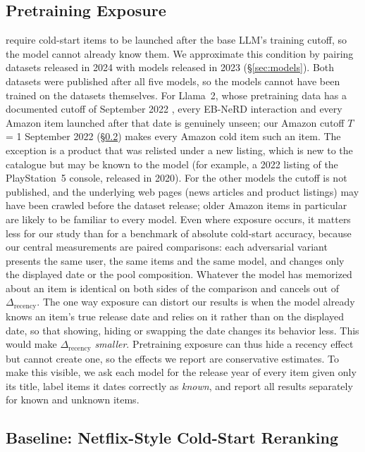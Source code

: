 \documentclass[11pt]{article}
\begin{document}
\subsection{Pretraining Exposure}\label{sec:exposure}
\citet{li2026llmreasoning} require cold-start items to be launched after the base LLM's training cutoff, so the model cannot already know them. We approximate this condition by pairing datasets released in 2024 with models released in 2023 (\S\ref{sec:models}). Both datasets were published after all five models, so the models cannot have been trained on the datasets themselves. For Llama~2, whose pretraining data has a documented cutoff of September 2022 \citep{touvron2023llama2}, every EB-NeRD interaction and every Amazon item launched after that date is genuinely unseen; our Amazon cutoff $T$ = 1 September 2022 (\S\ref{sec:baseline}) makes every Amazon cold item such an item. The exception is a product that was relisted under a new listing, which is new to the catalogue but may be known to the model (for example, a 2022 listing of the PlayStation~5 console, released in 2020). For the other models the cutoff is not published, and the underlying web pages (news articles and product listings) may have been crawled before the dataset release; older Amazon items in particular are likely to be familiar to every model. Even where exposure occurs, it matters less for our study than for a benchmark of absolute cold-start accuracy, because our central measurements are paired comparisons: each adversarial variant presents the same user, the same items and the same model, and changes only the displayed date or the pool composition. Whatever the model has memorized about an item is identical on both sides of the comparison and cancels out of $\Delta_{\text{recency}}$. The one way exposure can distort our results is when the model already knows an item's true release date and relies on it rather than on the displayed date, so that showing, hiding or swapping the date changes its behavior less. This would make $\Delta_{\text{recency}}$ \emph{smaller}. Pretraining exposure can thus hide a recency effect but cannot create one, so the effects we report are conservative estimates. To make this visible, we ask each model for the release year of every item given only its title, label items it dates correctly as \emph{known}, and report all results separately for known and unknown items.

\subsection{Baseline: Netflix-Style Cold-Start Reranking}\label{sec:baseline}
\end{document}
